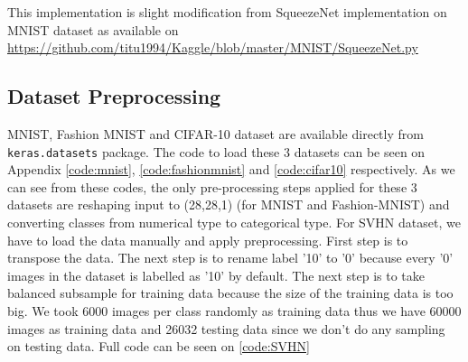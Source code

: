 This implementation is slight modification from SqueezeNet implementation on MNIST dataset as available on \href{https://github.com/titu1994/Kaggle/blob/master/MNIST/SqueezeNet.py}{https://github.com/titu1994/Kaggle/blob/master/MNIST/SqueezeNet.py}

\subsection{Dataset Preprocessing}
MNIST, Fashion MNIST and CIFAR-10 dataset are available directly from {\tt{keras.datasets}} package. The code to load these 3 datasets can be seen on Appendix \ref{code:mnist}, \ref{code:fashionmnist} and \ref{code:cifar10} respectively. As we can see from these codes, the only pre-processing steps applied for these 3 datasets are reshaping input to (28,28,1) (for MNIST and Fashion-MNIST) and converting classes from numerical type to categorical type. For SVHN dataset, we have to load the data manually and apply preprocessing. First step is to transpose the data. The next step is to rename label '10' to '0' because every '0' images in the dataset is labelled as '10' by default. The next step is to take balanced subsample for training data because the size of the training data is too big. We took 6000 images per class randomly as training data thus we have 60000 images as training data and 26032 testing data since we don't do any sampling on testing data. Full code can be seen on \ref{code:SVHN}



